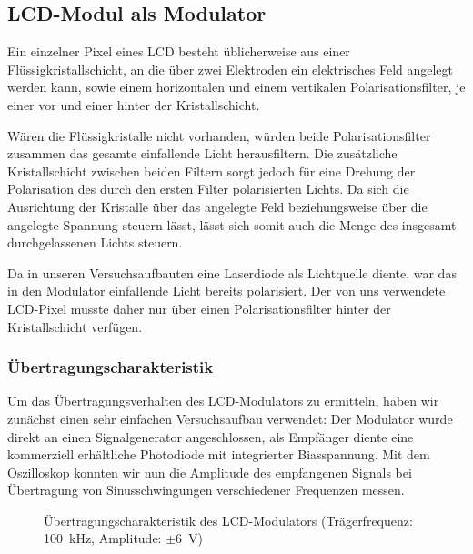 \documentclass[12pt,a4paper]{article}
\begin{document}
\subsection{LCD-Modul als Modulator}
Ein einzelner Pixel eines LCD besteht üblicherweise aus einer Flüssigkristallschicht, an die über zwei Elektroden ein elektrisches Feld angelegt werden kann, sowie einem horizontalen und einem vertikalen Polarisationsfilter, je einer vor und einer hinter der Kristallschicht.

Wären die Flüssigkristalle nicht vorhanden, würden beide Polarisationsfilter zusammen das gesamte einfallende Licht herausfiltern. Die zusätzliche Kristallschicht zwischen beiden Filtern sorgt jedoch für eine Drehung der Polarisation des durch den ersten Filter polarisierten Lichts. Da sich die Ausrichtung der Kristalle über das angelegte Feld beziehungsweise über die angelegte Spannung steuern lässt, lässt sich somit auch die Menge des insgesamt durchgelassenen Lichts steuern.

Da in unseren Versuchsaufbauten eine Laserdiode als Lichtquelle diente, war das in den Modulator einfallende Licht bereits polarisiert. Der von uns verwendete LCD-Pixel musste daher nur über einen Polarisationsfilter hinter der Kristallschicht verfügen.

\subsubsection{Übertragungscharakteristik}
\label{sec:lcd_transfer_characteristics}

Um das Übertragungsverhalten des LCD-Modulators zu ermitteln, haben wir zunächst einen sehr einfachen Versuchsaufbau verwendet: Der Modulator wurde direkt an einen Signalgenerator angeschlossen, als Empfänger diente eine kommerziell erhältliche Photodiode mit integrierter Biasspannung. Mit dem Oszilloskop konnten wir nun die Amplitude des empfangenen Signals bei Übertragung von Sinusschwingungen verschiedener Frequenzen messen.

\begin{figure}[H]
  \centering
  \caption{Übertragungscharakteristik des LCD-Modulators (Trägerfrequenz: \SI{100}{\kilo\hertz}, Amplitude: $\pm$\SI{6}{\volt})}
  \label{fig:lcd_transfer_function}
\end{figure}
\end{document}
